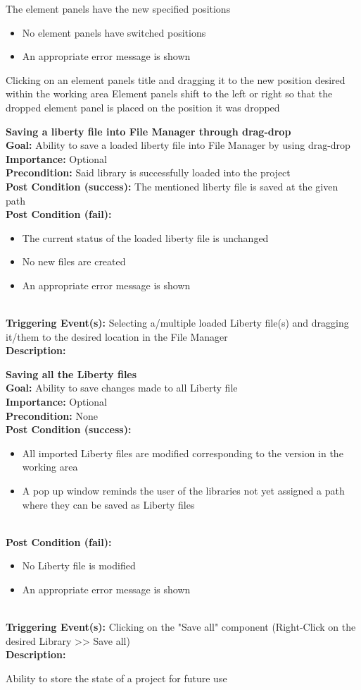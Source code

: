 \documentclass[10pt,a4paper]{report}
\newcommand{\precondition}[1]{
    \textbf{Precondition: } #1 \leavevmode \\
}
\newcommand{\FRDescription}[8]{
    \textbf{#1} \leavevmode \\
    \textbf{Goal: } #2 \leavevmode \\
    \textbf{Importance: } #3 \leavevmode \\
    \precondition{#4}
    \textbf{Post Condition (success): } #5 \leavevmode \\
    \textbf{Post Condition (fail): } #6 \leavevmode \\
    \textbf{Triggering Event(s): } #7 \leavevmode \\
    \textbf{Description: } \leavevmode \\ 
    #8}
\newcommand{\FRODescription}[8]{
    \textbf{#1} \leavevmode \\
    \textbf{Goal: } #2 \leavevmode \\
    \textbf{Importance: } #3 \leavevmode \\
    \precondition{#4}
    \textbf{Post Condition (success): } #5 \leavevmode \\
    \textbf{Post Condition (fail): } #6 \leavevmode \\
    \textbf{Triggering Event(s): } #7 \leavevmode \\
    \textbf{Description: } \leavevmode \\
    #8}
\begin{document}
\begin{FRO}
    {The element panels have the new specified positions}
    {\begin{itemize}
        \item No element panels have switched positions
        \item An appropriate error message is shown
    \end{itemize}}
    {Clicking on an element panels title and dragging it to the new position desired within the working area}
    {Element panels shift to the left or right so that the dropped element panel is placed on the position it was dropped}
    \item \FRODescription{Saving a liberty file into File Manager through drag-drop}
    {Ability to save a loaded liberty file into File Manager by using drag-drop}
    {Optional}
    {Said library is successfully loaded into the project}
    {The mentioned liberty file is saved at the given path}
    {\begin{itemize}
        \item The current status of the loaded liberty file is unchanged
        \item No new files are created
        \item An appropriate error message is shown
    \end{itemize}}
    {Selecting a/multiple loaded Liberty file(s) and dragging it/them to the desired location in the File Manager}
    \item \FRDescription{Saving all the Liberty files}
    {Ability to save changes made to all Liberty file}
    {Optional}
    {None}
    {\begin{itemize}
        \item All imported Liberty files are modified corresponding to the version in the working area
        \item A pop up window reminds the user of the libraries not yet assigned a path where they can be saved as Liberty files
    \end{itemize}}
    {\begin{itemize}
        \item No Liberty file is modified
        \item An appropriate error message is shown
    \end{itemize}}
    {Clicking on the "Save all" component (Right-Click on the desired Library  >> Save all)}
    \item {}
    {Ability to store the state of a project for future use}

\end{FRO}
\end{document}
